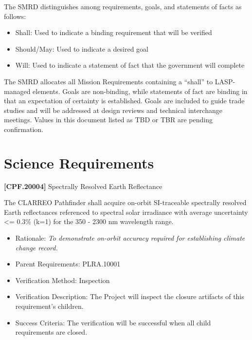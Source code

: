 \documentclass[12pt,oneside,oldfontcommands]{memoir}
\begin{document}
The \gls{SMRD} distinguishes among requirements, goals, and statements of facts as follows:

\begin{itemize}
\item{} Shall: Used to indicate a binding requirement that will be verified

\item{} Should\slash May: Used to indicate a desired goal

\item{} Will: Used to indicate a statement of fact that the government will complete

\end{itemize}

The \gls{SMRD} allocates all Mission Requirements containing a ``shall'' to \gls{LASP}-managed elements. Goals are non-binding, while statements of fact are binding in that an expectation of certainty is established. Goals are included to guide trade studies and will be addressed at design reviews and technical interchange meetings. Values in this document listed as TBD or TBR are pending confirmation.

\section{Science Requirements}
\label{sciencerequirements}

\textbf{[CPF.20004]} Spectrally Resolved Earth Reflectance

The \gls{CLARREO} Pathfinder shall acquire on-orbit \gls{SI}-traceable spectrally resolved Earth reflectances referenced to spectral solar irradiance with average uncertainty <= 0.3\% (k=1) for the 350 - 2300 nm wavelength range.

\begin{itemize}
\item{} Rationale: \emph{To demonstrate on-orbit accuracy required for establishing climate change record.}

\item{} Parent Requirements: PLRA.10001

\item{} Verification Method: Inspection

\item{} Verification Description: The Project will inspect the closure artifacts of this requirement's children.

\item{} Success Criteria: The verification will be successful when all child requirements are closed.

\end{itemize}
\end{document}
